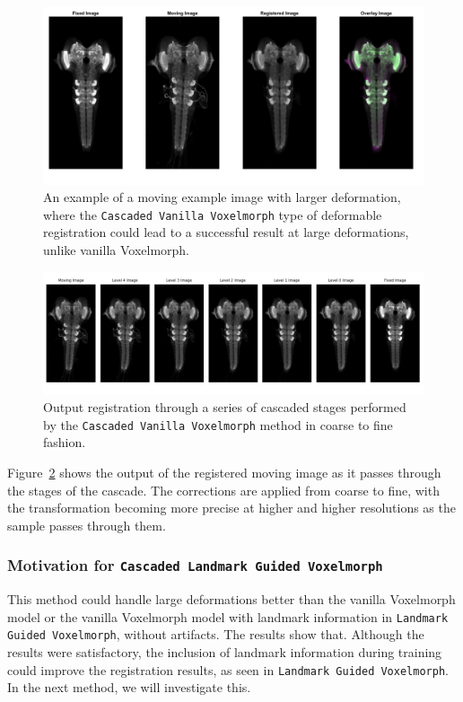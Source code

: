 \documentclass{book}
\begin{document}
	\begin{figure}[h!]
		\centering
		\includegraphics[width=0.9\columnwidth]{resources/chapter4/method3/compare/np_60H12_14E09_MB049B_020113B_scaled.tif.png}
		\caption{An example of a moving example image with larger deformation, where the \texttt{Cascaded Vanilla Voxelmorph} type of deformable registration could lead to a successful result at large deformations, unlike vanilla Voxelmorph.}
		\label{fig:Cascaded Vanilla Voxelmorph_fail}
	\end{figure}
	
	\begin{figure}[h!]
		\centering
		\includegraphics[width=0.9\columnwidth]{resources/chapter4/method3/np_60H12_14E09_MB049B_020113B_scaled.png}
		\caption{Output registration through a series of cascaded stages performed by the \texttt{Cascaded Vanilla Voxelmorph} method in coarse to fine fashion.}
		\label{fig:Cascaded Vanilla Voxelmorph_cascade}
	\end{figure}
	
	Figure~\ref{fig:Cascaded Vanilla Voxelmorph_cascade} shows the output of the registered moving image as it passes through the stages of the cascade. The corrections are applied from coarse to fine, with the transformation becoming more precise at higher and higher resolutions as the sample passes through them.
	
	\subsubsection{Motivation for \texttt{Cascaded Landmark Guided Voxelmorph}}
	This method could handle large deformations better than the vanilla Voxelmorph model or the vanilla Voxelmorph model with landmark information in \texttt{Landmark Guided Voxelmorph}, without artifacts. The results show that. Although the results were satisfactory, the inclusion of landmark information during training could improve the registration results, as seen in \texttt{Landmark Guided Voxelmorph}. In the next method, we will investigate this.
	
\end{document}
